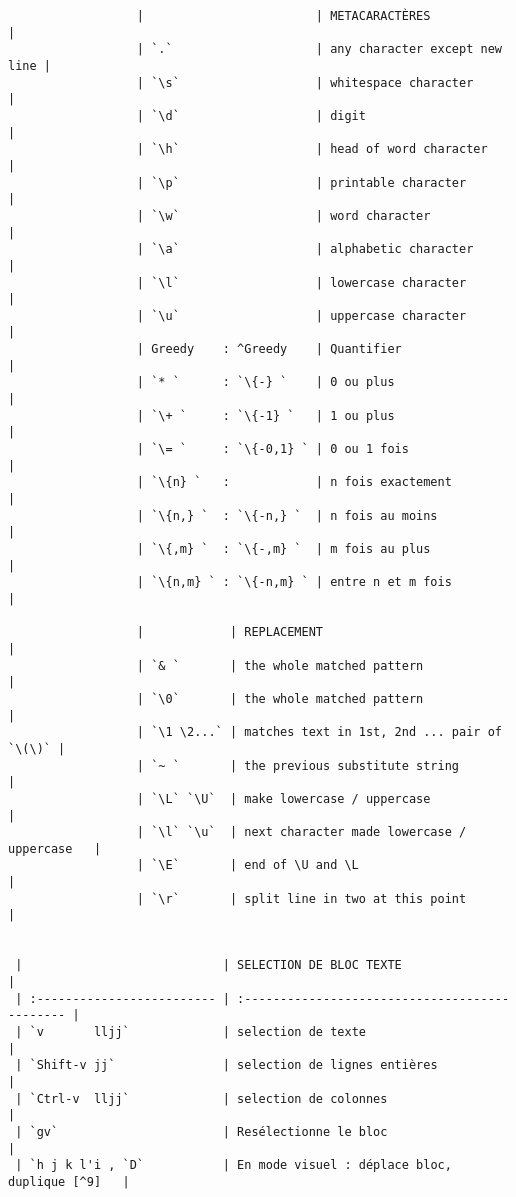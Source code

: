 \documentclass[10pt,landscape]{article}
\begin{document}
\begin{multicols}{2}
\begin{verbatim}
                  |                        | METACARACTÈRES                |
                  | `.`                    | any character except new line |
                  | `\s`                   | whitespace character          |
                  | `\d`                   | digit                         |
                  | `\h`                   | head of word character        |
                  | `\p`                   | printable character           |
                  | `\w`                   | word character                |
                  | `\a`                   | alphabetic character          |
                  | `\l`                   | lowercase character           |
                  | `\u`                   | uppercase character           |
                  | Greedy    : ^Greedy    | Quantifier                    |
                  | `* `      : `\{-} `    | 0 ou plus                     |
                  | `\+ `     : `\{-1} `   | 1 ou plus                     |
                  | `\= `     : `\{-0,1} ` | 0 ou 1 fois                   |
                  | `\{n} `   :            | n fois exactement             |
                  | `\{n,} `  : `\{-n,} `  | n fois au moins               |
                  | `\{,m} `  : `\{-,m} `  | m fois au plus                |
                  | `\{n,m} ` : `\{-n,m} ` | entre n et m fois             |

                  |            | REPLACEMENT                                 |
                  | `& `       | the whole matched pattern                   |
                  | `\0`       | the whole matched pattern                   |
                  | `\1 \2...` | matches text in 1st, 2nd ... pair of `\(\)` |
                  | `~ `       | the previous substitute string              |
                  | `\L` `\U`  | make lowercase / uppercase                  |
                  | `\l` `\u`  | next character made lowercase / uppercase   |
                  | `\E`       | end of \U and \L                            |
                  | `\r`       | split line in two at this point             |


 |                            | SELECTION DE BLOC TEXTE                        |
 | :------------------------- | :--------------------------------------------- |
 | `v       lljj`             | selection de texte                             |
 | `Shift-v jj`               | selection de lignes entières                   |
 | `Ctrl-v  lljj`             | selection de colonnes                          |
 | `gv`                       | Resélectionne le bloc                          |
 | `h j k l'i , `D`           | En mode visuel : déplace bloc, duplique [^9]   |


\end{verbatim}
\end{multicols}
\end{document}
